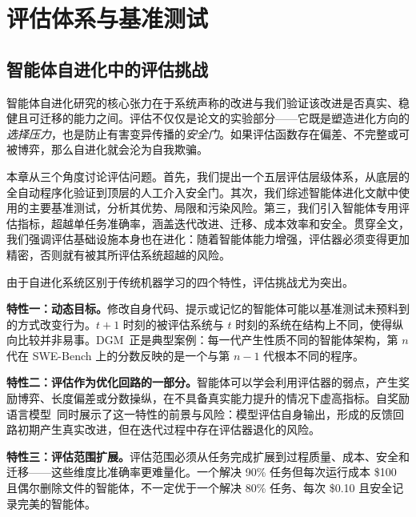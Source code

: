 
\section{评估体系与基准测试}
\label{ch:evaluation}

\subsection{智能体自进化中的评估挑战}
\label{sec:eval-challenge}

智能体自进化研究的核心张力在于系统声称的改进与我们验证该改进是否真实、稳健且可迁移的能力之间。评估不仅仅是论文的实验部分——它既是塑造进化方向的\emph{选择压力}，也是防止有害变异传播的\emph{安全门}。如果评估函数存在偏差、不完整或可被博弈，那么自进化就会沦为自我欺骗。

本章从三个角度讨论评估问题。首先，我们提出一个五层评估层级体系，从底层的全自动程序化验证到顶层的人工介入安全门。其次，我们综述智能体进化文献中使用的主要基准测试，分析其优势、局限和污染风险。第三，我们引入智能体专用评估指标，超越单任务准确率，涵盖迭代改进、迁移、成本效率和安全。贯穿全文，我们强调评估基础设施本身也在进化：随着智能体能力增强，评估器必须变得更加精密，否则就有被其所评估系统超越的风险。

由于自进化系统区别于传统机器学习的四个特性，评估挑战尤为突出。

\textbf{特性一：动态目标。}修改自身代码、提示或记忆的智能体可能以基准测试未预料到的方式改变行为。$t+1$ 时刻的被评估系统与 $t$ 时刻的系统在结构上不同，使得纵向比较并非易事。DGM~\citep{darwingodelmachine2025}正是典型案例：每一代产生性质不同的智能体架构，第 $n$ 代在 SWE-Bench 上的分数反映的是一个与第 $n-1$ 代根本不同的程序。

\textbf{特性二：评估作为优化回路的一部分。}智能体可以学会利用评估器的弱点，产生奖励博弈、长度偏差或分数操纵，在不具备真实能力提升的情况下虚高指标。自奖励语言模型~\citep{selfrewarding2024}同时展示了这一特性的前景与风险：模型评估自身输出，形成的反馈回路初期产生真实改进，但在迭代过程中存在评估器退化的风险。

\textbf{特性三：评估范围扩展。}评估范围必须从任务完成扩展到过程质量、成本、安全和迁移——这些维度比准确率更难量化。一个解决 90\% 任务但每次运行成本 \$100 且偶尔删除文件的智能体，不一定优于一个解决 80\% 任务、每次 \$0.10 且安全记录完美的智能体。

